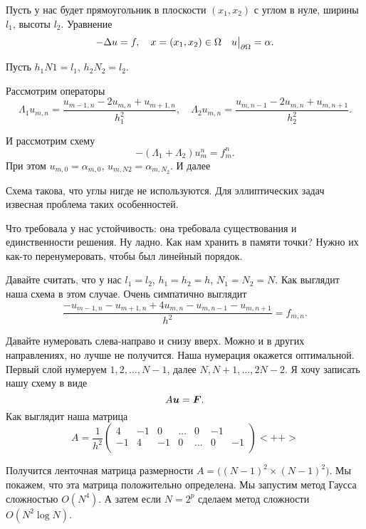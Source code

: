 Пусть у нас будет прямоугольник в плоскости $(x_1,x_2)$ с углом в нуле, ширины $l_1$, высоты $l_2$. Уравнение
\[
  -\Delta u = f,\quad x = (x_1,x_2)\in\Omega\quad u\big|_{\partial\Omega} = \alpha.
\]

Пусть $h_1N1 = l_1$, $h_2N_2 = l_2$.

Рассмотрим операторы
\[
  \Lambda_1 u_{m,n} = \frac{u_{m-1,n} - 2u_{m,n} + u_{m+1,n}}{h_1^2},\quad
  \Lambda_2 u_{m,n} = \frac{u_{m,n-1} - 2u_{m,n} + u_{m,n+1}}{h_2^2}.
\]

И рассмотрим схему
\[
  -(\Lambda_1+\Lambda_2)u_m^n = f_m^n.
\]
При этом $u_{m,0}=\alpha_{m,0}$, $u_{m,N2} = \alpha_{m,N_2}$. И далее

Схема такова, что углы нигде не используются. Для эллиптических задач извесная проблема таких особенностей.

Что требовала у нас устойчивость: она требовала существования и единственности решения. Ну ладно. Как нам хранить в памяти точки? Нужно их как-то перенумеровать, чтобы был линейный порядок.

Давайте считать, что у нас $l_1=l_2$, $h_1=h_2=h$, $N_1=N_2=N$. Как выглядит наша схема в этом случае. Очень симпатично выглядит
\[
  \frac{ - u_{m-1,n} - u_{m+1,n} + 4u_{m,n} - u_{m,n-1} - u_{m,n+1}}{h^2} = f_{m,n}.
\]

Давайте нумеровать слева-направо и снизу вверх. Можно и в других направлениях, но лучше не получится. Наша нумерация окажется оптимальной. Первый слой нумеруем $1,2,\dots,N-1$, далее $N,N+1,\dots,2N-2$. Я хочу записать нашу схему в виде
\[
  A \boldsymbol{u} = \boldsymbol{F}.
\]
Как выглядит наша матрица
\[
  A = \frac1{h^2}\begin{pmatrix}
  4 & -1 & 0 &\dots &0 &-1\\
  -1 & 4 & -1 & 0 & \dots & 0 & -1\\
\end{pmatrix}<++>
\]

Получится ленточная матрица размерности $A = \big((N-1)^2\times (N-1)^2\big)$. Мы покажем, что эта матрица положительно определена. Мы запустим метод Гаусса сложностью $O(N^4)$. А затем если $N=2^p$ сделаем метод сложности $O(N^2\log N)$.
